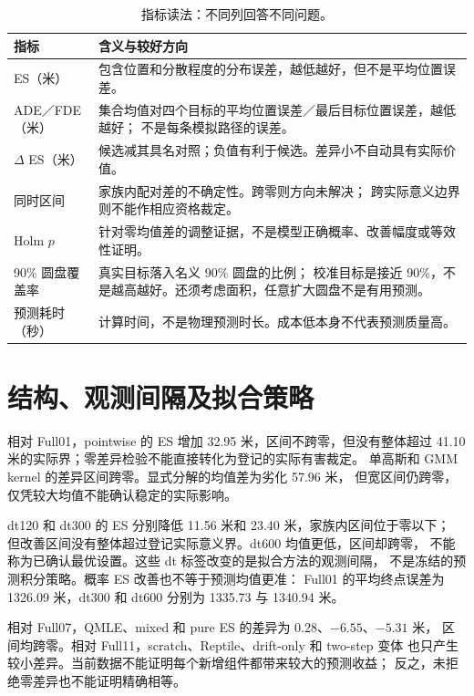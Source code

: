 \begin{table}[htbp]
\centering\small
\caption{指标读法：不同列回答不同问题。}
\label{tab:metric-reader}\hypertarget{tab:metric-reader}{}
\begin{tabular}{@{}p{.22\linewidth}p{.69\linewidth}@{}}
\toprule
指标 & 含义与较好方向\\
\midrule
ES（米） & 包含位置和分散程度的分布误差，越低越好，但不是平均位置误差。\\
ADE／FDE（米） & 集合均值对四个目标的平均位置误差／最后目标位置误差，越低越好；
不是每条模拟路径的误差。\\
$\Delta$ ES（米） & 候选减其具名对照；负值有利于候选。差异小不自动具有实际价值。\\
同时区间 & 家族内配对差的不确定性。跨零则方向未解决；
跨实际意义边界则不能作相应资格裁定。\\
Holm $p$ & 针对零均值差的调整证据，不是模型正确概率、改善幅度或等效性证明。\\
90\% 圆盘覆盖率 & 真实目标落入名义 90\% 圆盘的比例；
校准目标是接近 90\%，不是越高越好。还须考虑面积，任意扩大圆盘不是有用预测。\\
预测耗时（秒） & 计算时间，不是物理预测时长。成本低本身不代表预测质量高。\\
\bottomrule
\end{tabular}
\end{table}

\FloatBarrier

\section{结构、观测间隔及拟合策略}
\label{sec:method-findings}\hypertarget{sec:method-findings}{}
相对 Full01，pointwise 的 ES 增加 32.95 米，区间不跨零，但没有整体超过
41.10 米的实际界；零差异检验不能直接转化为登记的实际有害裁定。
单高斯和 GMM kernel 的差异区间跨零。显式分解的均值差为劣化 57.96 米，
但宽区间仍跨零，仅凭较大均值不能确认稳定的实际影响。

dt120 和 dt300 的 ES 分别降低 11.56 米和 23.40 米，家族内区间位于零以下；
但改善区间没有整体超过登记实际意义界。dt600 均值更低，区间却跨零，
不能称为已确认最优设置。这些 dt 标签改变的是拟合方法的观测间隔，
不是冻结的预测积分策略。概率 ES 改善也不等于预测均值更准：
Full01 的平均终点误差为 1326.09 米，dt300 和 dt600 分别为 1335.73 与 1340.94 米。

相对 Full07，QMLE、mixed 和 pure ES 的差异为 0.28、$-6.55$、$-5.31$ 米，
区间均跨零。相对 Full11，scratch、Reptile、drift-only 和 two-step 变体
也只产生较小差异。当前数据不能证明每个新增组件都带来较大的预测收益；
反之，未拒绝零差异也不能证明精确相等。

